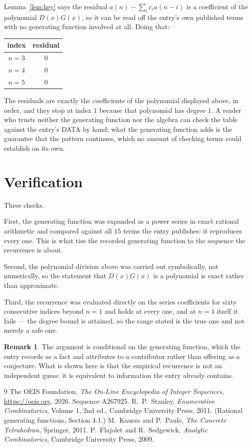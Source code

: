\documentclass[11pt,a4paper]{article}
\theoremstyle{plain}
\theoremstyle{definition}
\newtheorem{remark}[theorem]{Remark}
\begin{document}
Lemma~\ref{lem:key} says the residual $a(n)-\sum_ic_ia(n-i)$ is a coefficient of the
polynomial $D(x)G(x)$, so it can be read off the entry's own published terms with no
generating function involved at all. Doing that:
\begin{center}
\begin{tabular}{cc}
index & residual \\ \hline
$n=3$ & $0$ \\
$n=4$ & $0$ \\
$n=5$ & $0$
\end{tabular}
\end{center}
The residuals are exactly the coefficients of the polynomial displayed above, in order, and
they stop at index $1$ because that polynomial has degree $1$. A reader who trusts
neither the generating function nor the algebra can check the table against the entry's DATA
by hand; what the generating function adds is the guarantee that the pattern continues, which
no amount of checking terms could establish on its own.

\section{Verification}

Three checks.

First, the generating function was expanded as a power series in exact rational arithmetic and
compared against all $15$ terms the entry publishes: it reproduces every one. This is
what ties the recorded generating function to the sequence the recurrence is about.

Second, the polynomial division above was carried out symbolically, not numerically, so the
statement that $D(x)G(x)$ is a polynomial is exact rather than approximate.

Third, the recurrence was evaluated directly on the series coefficients for sixty consecutive
indices beyond $n=1$ and holds at every one, and at $n=1$ itself it fails --- the
degree bound is attained, so the range stated is the true one and not merely a safe one.

\begin{remark}
The argument is conditional on the generating function, which the entry records as a fact and
attributes to a contributor rather than offering as a conjecture. What is shown here is that
the empirical recurrence is not an independent guess: it is equivalent to information the
entry already contains.
\end{remark}

\begin{thebibliography}{9}
 The OEIS Foundation, \emph{The On-Line Encyclopedia of Integer
Sequences}, \url{https://oeis.org}, 2026. Sequence A267925.
 R.~P.~Stanley, \emph{Enumerative Combinatorics}, Volume 1, 2nd ed.,
Cambridge University Press, 2011. (Rational generating functions, Section 4.1.)
 M.~Kauers and P.~Paule, \emph{The Concrete Tetrahedron}, Springer, 2011.
 P.~Flajolet and R.~Sedgewick, \emph{Analytic Combinatorics}, Cambridge
University Press, 2009.
\end{thebibliography}
\end{document}
